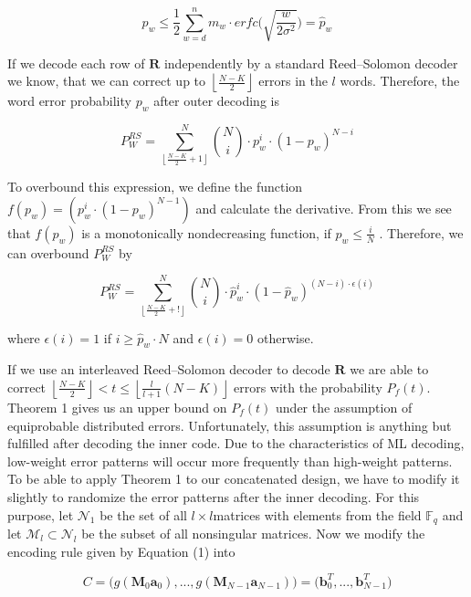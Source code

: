 \documentclass[fontsize=12pt]{article}
\begin{document}
\begin{equation}
p_w \leq \frac{1}{2} \sum_{w=d}^{n} m_w \cdot erfc\Big( \sqrt{\frac{w}{2\sigma^2}}\Big) = \hat{p}_w
\end{equation}

If we decode each row of $\mathbf{R}$ independently by a standard
Reed–Solomon decoder we know, that we can correct up
to $ \left \lfloor \frac{N-K}{2} \right \rfloor $ errors in the $l$ words. Therefore, the word error
probability 
$p_w$ after outer decoding is

\begin{equation}
P_W^{RS} = \sum_{ \left \lfloor \frac{N-K}{2}+1 \right \rfloor }^{N}\binom{N}{i}\cdot p_w^i\cdot(1-p_w)^{N-i}
\end{equation}

To overbound this expression, we define the function$f(p_w) = (p_w^i \cdot (1-p_w)^{N-1} )$
 and calculate the derivative.
From this we see that $f(p_w)$  is a monotonically nondecreasing
function, if $p_w \leq \frac{i}{N}$ . Therefore, we can overbound
$P_W^{RS}$ by

\begin{equation}
P_W^{RS} = \sum_{ \left \lfloor \frac{N-K}{2}+! \right \rfloor }^{N}\binom{N}{i}\cdot \hat{p}_w^i\cdot(1-\hat{p}_w)^{(N-i)\cdot \epsilon(i) }
\end{equation}

where $\epsilon(i) = 1$ if $i \geq \hat{p}_w\cdot N$ and $\epsilon(i) = 0$ otherwise.

If we use an interleaved Reed–Solomon decoder to decode
$\mathbf{R}$ we are able to correct $ \left \lfloor \frac{N-K}{2} \right \rfloor < t \leq  \left \lfloor \frac{l}{l+1} ({N - K}) \right \rfloor$ errors
with the probability 
$P_f(t)$. Theorem 1 gives us an upper bound
on 
$P_f(t)$ under the assumption of equiprobable distributed
errors. Unfortunately, this assumption is anything but fulfilled
after decoding the inner code. Due to the characteristics of ML
decoding, low-weight error patterns will occur more frequently
than high-weight patterns. To be able to apply Theorem 1
to our concatenated design, we have to modify it slightly to
randomize the error patterns after the inner decoding. For this
purpose, let $\mathcal{N}_1$ be the set of all $l \times l$matrices with elements
from the field $\mathbb{F}_q$ and let $\mathcal{M}_l \subset \mathcal{N}_l$ be the subset of all nonsingular
matrices. Now we modify the encoding rule given by
Equation (1) into

$$
C=\Big( g(\mathbf{M}_0\textbf{a}_0),...,g(\mathbf{M}_{N-1}\textbf{a}_{N-1})\Big) = \Big( \textbf{b}_0^T,...,\textbf{b}_{N-1}^T\Big)$$
\end{document}
